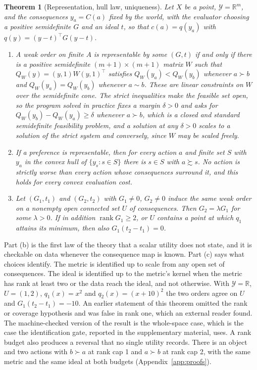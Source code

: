 \documentclass{article}
\newtheorem{theorem}{Theorem}
\theoremstyle{definition}
\theoremstyle{remark}
\newcommand{\Y}{\mathcal{Y}}
\newcommand{\R}{\mathbb{R}}
\newif\ifcornerstone
\begin{document}
\begin{theorem}[Representation, hull law, uniqueness]
\label{thm:repr}
Let $X$ be a point, $\Y=\R^{m}$, and the consequences $y_{a}=C(a)$ fixed by the world, with the evaluator choosing a positive semidefinite $G$ and an ideal $t$, so that $c(a)=q(y_{a})$ with $q(y)=(y-t)^{\top}G(y-t)$.
\begin{enumerate}
\item[(a)] A weak order on finite $A$ is representable by some $(G,t)$ if and only if there is a positive semidefinite $(m+1)\times(m+1)$ matrix $W$ such that $Q_{W}(y)=(y,1)W(y,1)^{\top}$ satisfies $Q_{W}(y_{a})<Q_{W}(y_{b})$ whenever $a\succ b$ and $Q_{W}(y_{a})=Q_{W}(y_{b})$ whenever $a\sim b$. These are linear constraints on $W$ over the semidefinite cone. The strict inequalities make the feasible set open, so the program solved in practice fixes a margin $\delta>0$ and asks for $Q_{W}(y_{b})-Q_{W}(y_{a})\ge\delta$ whenever $a\succ b$, which is a closed and standard semidefinite feasibility problem, and a solution at any $\delta>0$ scales to a solution of the strict system and conversely, since $W$ may be scaled freely.
\item[(b)] If a preference is representable, then for every action $a$ and finite set $S$ with $y_{a}$ in the convex hull of $\{y_{s}:s\in S\}$ there is $s\in S$ with $a\succsim s$. No action is strictly worse than every action whose consequences surround it, and this holds for every convex evaluation cost.
\item[(c)] Let $(G_{1},t_{1})$ and $(G_{2},t_{2})$ with $G_{1}\neq0$, $G_{2}\ne0$ induce the same weak order on a nonempty open connected set $U$ of consequences. Then $G_{2}=\lambda G_{1}$ for some $\lambda>0$. If in addition $\operatorname{rank}G_{1}\ge2$, or $U$ contains a point at which $q_{1}$ attains its minimum, then also $G_{1}(t_{2}-t_{1})=0$.
\end{enumerate}
\end{theorem}

Part (b) is the first law of the theory that a scalar utility does not state, and it is checkable on data whenever the consequence map is known.
Part (c) says what choices identify.
The metric is identified up to scale from any open set of consequences.
The ideal is identified up to the metric's kernel when the metric has rank at least two or the data reach the ideal, and not otherwise. With $\Y=\R$, $U=(1,2)$, $q_{1}(x)=x^{2}$ and $q_{2}(x)=(x+10)^{2}$ the two orders agree on $U$ and $G_{1}(t_{2}-t_{1})=-10$.
An earlier statement of this theorem omitted the rank or coverage hypothesis and was false in rank one, which an external reader found. The machine-checked version of the result is the whole-space case, which is the case the identification gate\ifcornerstone{} of Section~\ref{sec:gates}\else{}, reported in the supplementary material,\fi{} uses.
A rank budget also produces a reversal that no single utility records. There is an object and two actions with $b\succ a$ at rank cap 1 and $a\succ b$ at rank cap 2, with the same metric and the same ideal at both budgets (Appendix~\ref{app:proofs}).
\end{document}
